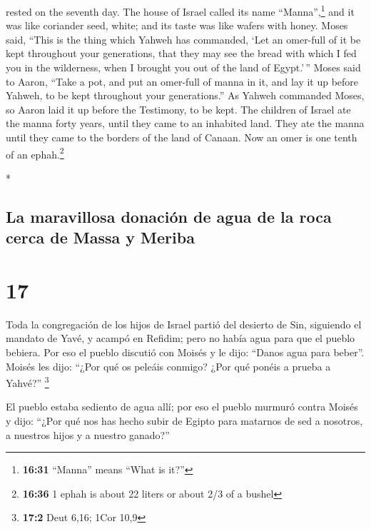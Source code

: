 \begin{paracol}{2}
\begin{otherlanguage}{english}
rested on the seventh day.  The house of Israel called
its name ``Manna'',\footnote{\textbf{16:31} ``Manna'' means ``What is
  it?''} and it was like coriander seed, white; and its taste was like
wafers with honey.  Moses said, ``This is the thing which
Yahweh has commanded, `Let an omer-full of it be kept throughout your
generations, that they may see the bread with which I fed you in the
wilderness, when I brought you out of the land of Egypt.'\,''
 Moses said to Aaron, ``Take a pot, and put an omer-full
of manna in it, and lay it up before Yahweh, to be kept throughout your
generations.''  As Yahweh commanded Moses, so Aaron laid
it up before the Testimony, to be kept.  The children of
Israel ate the manna forty years, until they came to an inhabited land.
They ate the manna until they came to the borders of the land of Canaan.
 Now an omer is one tenth of an ephah.\footnote{\textbf{16:36}
  1 ephah is about 22 liters or about 2/3 of a bushel}

\end{otherlanguage}

\switchcolumn[0]*

\hypertarget{la-maravillosa-donaciuxf3n-de-agua-de-la-roca-cerca-de-massa-y-meriba}{%
\subsection{La maravillosa donación de agua de la roca cerca de Massa y
Meriba}\label{la-maravillosa-donaciuxf3n-de-agua-de-la-roca-cerca-de-massa-y-meriba}}

\hypertarget{section-32}{%
\section{17}\label{section-32}}

 Toda la congregación de los hijos de Israel partió del
desierto de Sin, siguiendo el mandato de Yavé, y acampó en Refidim; pero
no había agua para que el pueblo bebiera.  Por eso el
pueblo discutió con Moisés y le dijo: ``Danos agua para beber''. Moisés
les dijo: ``¿Por qué os peleáis conmigo? ¿Por qué ponéis a prueba a
Yahvé?'' \footnote{\textbf{17:2} Deut 6,16; 1Cor 10,9}

 El pueblo estaba sediento de agua allí; por eso el pueblo
murmuró contra Moisés y dijo: ``¿Por qué nos has hecho subir de Egipto
para matarnos de sed a nosotros, a nuestros hijos y a nuestro ganado?''


\end{paracol}

